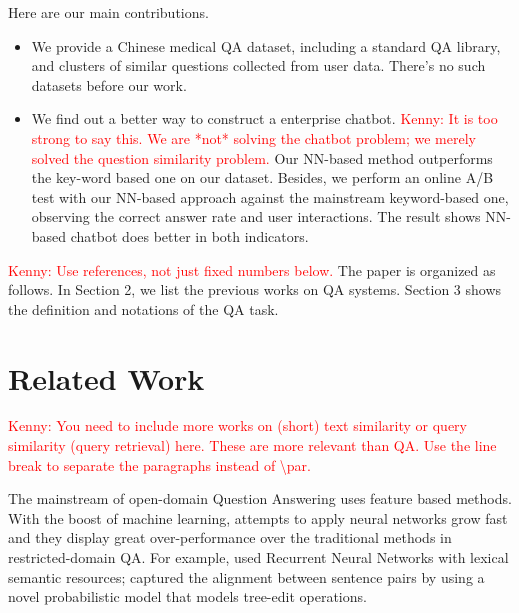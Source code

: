 \documentclass[a4paper,10pt]{article}
\newcommand{\KZ}[1]{\textcolor{red}{Kenny: #1}}
\begin{document}
Here are our main contributions.
\begin{itemize}
\item We provide a Chinese medical QA dataset, including a standard QA library, and clusters of similar questions collected from user data. There's no such datasets before our work.
\item We find out a better way to construct a enterprise chatbot. \KZ{It is
too strong to say this. We are *not* solving the chatbot problem; we merely
solved the question similarity problem.} Our NN-based method outperforms the key-word based one on our dataset. Besides, we perform an online A/B test with our NN-based approach against the mainstream keyword-based one, observing the correct answer rate and user interactions. The result shows NN-based chatbot does better in both indicators.
\end{itemize}

\KZ{Use references, not just fixed numbers below.}
The paper is organized as follows. In Section 2, we list the previous works on QA systems. Section 3 shows the definition and notations of the QA task.

\section{Related Work}
\KZ{You need to include more works on (short) text similarity or 
query similarity (query retrieval) here.  These are more relevant than QA.
Use the line break to separate the paragraphs instead of \textbackslash par.}

The mainstream of open-domain Question Answering uses feature based methods\cite{FeatureBased}. With the boost of machine learning, attempts to apply neural networks grow fast and they display great over-performance over the traditional methods in restricted-domain QA. For example, \cite{Yih2013} used Recurrent Neural Networks with lexical semantic resources; \cite{Wang2010} captured the alignment between sentence pairs by using a novel probabilistic model that models tree-edit operations.
\end{document}
